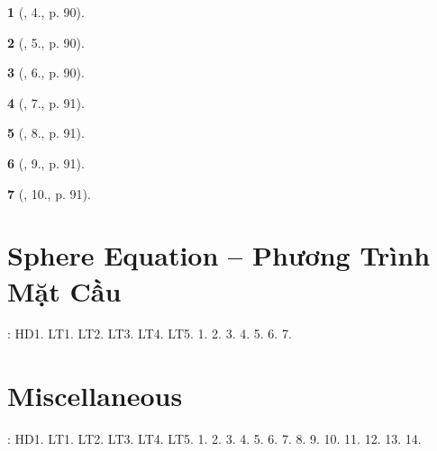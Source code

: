 \documentclass{article}
\newtheorem{baitoan}{}
\begin{document}
\begin{baitoan}[\cite{SGK_Toan_12_hinh_hoc_co_ban}, 4., p. 90]
	
\end{baitoan}

\begin{baitoan}[\cite{SGK_Toan_12_hinh_hoc_co_ban}, 5., p. 90]
	
\end{baitoan}

\begin{baitoan}[\cite{SGK_Toan_12_hinh_hoc_co_ban}, 6., p. 90]
	
\end{baitoan}

\begin{baitoan}[\cite{SGK_Toan_12_hinh_hoc_co_ban}, 7., p. 91]
	
\end{baitoan}

\begin{baitoan}[\cite{SGK_Toan_12_hinh_hoc_co_ban}, 8., p. 91]
	
\end{baitoan}

\begin{baitoan}[\cite{SGK_Toan_12_hinh_hoc_co_ban}, 9., p. 91]
	
\end{baitoan}

\begin{baitoan}[\cite{SGK_Toan_12_hinh_hoc_co_ban}, 10., p. 91]
	
\end{baitoan}


\section{Sphere Equation -- Phương Trình Mặt Cầu}
\cite[Chap. V, \S3, pp. 81--8]{SGK_Toan_12_Canh_Dieu_tap_2}: HD1. LT1. LT2. LT3. LT4. LT5. 1. 2. 3. 4. 5. 6. 7.


\section{Miscellaneous}
\cite[BTCCV, pp. 81--8]{SGK_Toan_12_Canh_Dieu_tap_2}: HD1. LT1. LT2. LT3. LT4. LT5. 1. 2. 3. 4. 5. 6. 7. 8. 9. 10. 11. 12. 13. 14.


\printbibliography[heading=bibintoc]
	
\end{document}
